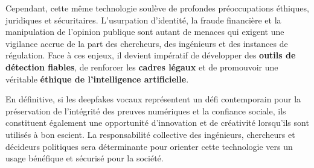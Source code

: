 \documentclass[memoire, 12pt]{report}
\begin{document}
Cependant, cette même technologie soulève de profondes préoccupations éthiques, juridiques et sécuritaires. 
L’usurpation d’identité, la fraude financière et la manipulation de l’opinion publique sont autant de menaces qui exigent une vigilance accrue de la part des chercheurs, des ingénieurs et des instances de régulation. 
Face à ces enjeux, il devient impératif de développer des \textbf{outils de détection fiables}, de renforcer les \textbf{cadres légaux} et de promouvoir une véritable \textbf{éthique de l’intelligence artificielle}.

En définitive, si les deepfakes vocaux représentent un défi contemporain pour la préservation de l’intégrité des preuves numériques et la confiance sociale, ils constituent également une opportunité d’innovation et de créativité lorsqu’ils sont utilisés à bon escient. 
La responsabilité collective des ingénieurs, chercheurs et décideurs politiques sera déterminante pour orienter cette technologie vers un usage bénéfique et sécurisé pour la société.
\end{document}
